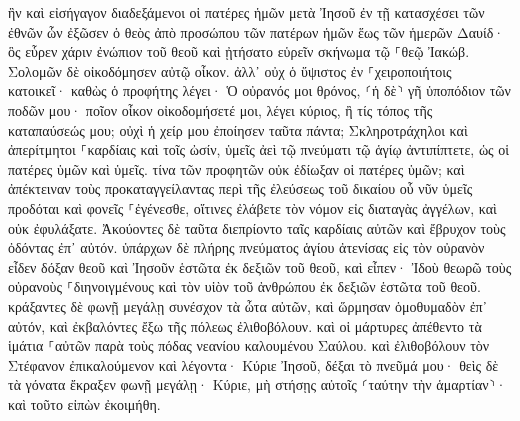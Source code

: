 \documentclass[twoside, 9pt]{extreport}
\begin{document}
ἣν καὶ εἰσήγαγον διαδεξάμενοι οἱ πατέρες ἡμῶν μετὰ Ἰησοῦ ἐν τῇ κατασχέσει τῶν ἐθνῶν ὧν ἐξῶσεν ὁ θεὸς ἀπὸ προσώπου τῶν πατέρων ἡμῶν ἕως τῶν ἡμερῶν Δαυίδ· 
ὃς εὗρεν χάριν ἐνώπιον τοῦ θεοῦ καὶ ᾐτήσατο εὑρεῖν σκήνωμα τῷ ⸀θεῷ Ἰακώβ. 
Σολομῶν δὲ οἰκοδόμησεν αὐτῷ οἶκον. 
ἀλλ᾽ οὐχ ὁ ὕψιστος ἐν ⸀χειροποιήτοις κατοικεῖ· καθὼς ὁ προφήτης λέγει· 
Ὁ οὐρανός μοι θρόνος, ⸂ἡ δὲ⸃ γῆ ὑποπόδιον τῶν ποδῶν μου· ποῖον οἶκον οἰκοδομήσετέ μοι, λέγει κύριος, ἢ τίς τόπος τῆς καταπαύσεώς μου; 
οὐχὶ ἡ χείρ μου ἐποίησεν ταῦτα πάντα; 
Σκληροτράχηλοι καὶ ἀπερίτμητοι ⸀καρδίαις καὶ τοῖς ὠσίν, ὑμεῖς ἀεὶ τῷ πνεύματι τῷ ἁγίῳ ἀντιπίπτετε, ὡς οἱ πατέρες ὑμῶν καὶ ὑμεῖς. 
τίνα τῶν προφητῶν οὐκ ἐδίωξαν οἱ πατέρες ὑμῶν; καὶ ἀπέκτειναν τοὺς προκαταγγείλαντας περὶ τῆς ἐλεύσεως τοῦ δικαίου οὗ νῦν ὑμεῖς προδόται καὶ φονεῖς ⸀ἐγένεσθε, 
οἵτινες ἐλάβετε τὸν νόμον εἰς διαταγὰς ἀγγέλων, καὶ οὐκ ἐφυλάξατε. 
Ἀκούοντες δὲ ταῦτα διεπρίοντο ταῖς καρδίαις αὐτῶν καὶ ἔβρυχον τοὺς ὀδόντας ἐπ᾽ αὐτόν. 
ὑπάρχων δὲ πλήρης πνεύματος ἁγίου ἀτενίσας εἰς τὸν οὐρανὸν εἶδεν δόξαν θεοῦ καὶ Ἰησοῦν ἑστῶτα ἐκ δεξιῶν τοῦ θεοῦ, 
καὶ εἶπεν· Ἰδοὺ θεωρῶ τοὺς οὐρανοὺς ⸀διηνοιγμένους καὶ τὸν υἱὸν τοῦ ἀνθρώπου ἐκ δεξιῶν ἑστῶτα τοῦ θεοῦ. 
κράξαντες δὲ φωνῇ μεγάλῃ συνέσχον τὰ ὦτα αὐτῶν, καὶ ὥρμησαν ὁμοθυμαδὸν ἐπ᾽ αὐτόν, 
καὶ ἐκβαλόντες ἔξω τῆς πόλεως ἐλιθοβόλουν. καὶ οἱ μάρτυρες ἀπέθεντο τὰ ἱμάτια ⸀αὐτῶν παρὰ τοὺς πόδας νεανίου καλουμένου Σαύλου. 
καὶ ἐλιθοβόλουν τὸν Στέφανον ἐπικαλούμενον καὶ λέγοντα· Κύριε Ἰησοῦ, δέξαι τὸ πνεῦμά μου· 
θεὶς δὲ τὰ γόνατα ἔκραξεν φωνῇ μεγάλῃ· Κύριε, μὴ στήσῃς αὐτοῖς ⸂ταύτην τὴν ἁμαρτίαν⸃· καὶ τοῦτο εἰπὼν ἐκοιμήθη. 
\end{document}
